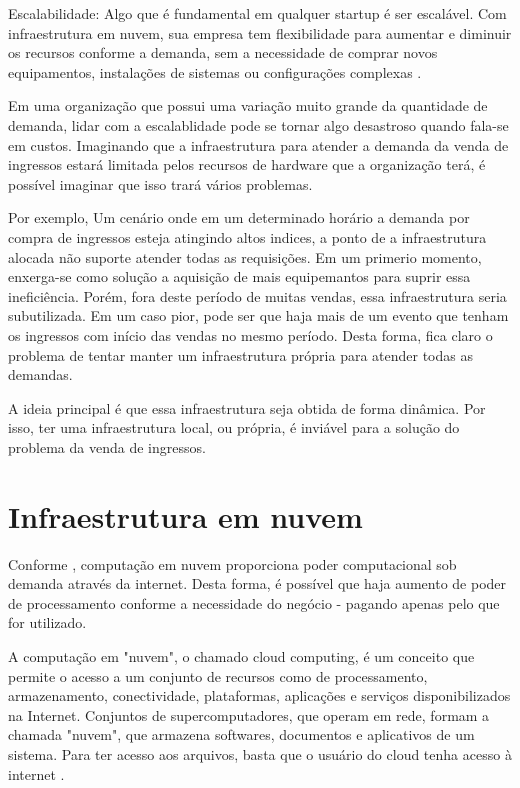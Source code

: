 \begin{citacao}
Escalabilidade: Algo que é fundamental em qualquer startup é ser escalável.
Com infraestrutura em nuvem, sua empresa tem flexibilidade para aumentar e
diminuir os recursos conforme a demanda, sem a necessidade de comprar novos equipamentos, 
instalações de sistemas ou configurações complexas 
\cite{beneficios-da-computacao-em-nuvem-para-sua-startup}.

\end{citacao}

Em uma organização que possui uma variação muito grande da quantidade de demanda, lidar
com a escalablidade pode se tornar algo desastroso quando fala-se em custos. Imaginando
que a infraestrutura para atender a demanda da venda de ingressos estará limitada
pelos recursos de hardware que a organização terá, é possível imaginar que isso trará
vários problemas.

Por exemplo, Um cenário onde em um determinado horário a demanda por compra de ingressos 
esteja atingindo altos indices, a ponto de a infraestrutura alocada não suporte atender 
todas as requisições. Em um primerio momento, enxerga-se como solução a aquisição de mais 
equipemantos para suprir essa ineficiência. Porém, fora deste período de muitas vendas, essa
infraestrutura seria subutilizada. Em um caso pior, pode ser que haja mais de um evento que
tenham os ingressos com início das vendas no mesmo período. Desta forma, fica claro o problema
de tentar manter um infraestrutura própria para atender todas as demandas.

A ideia principal é que essa infraestrutura seja obtida de forma dinâmica. Por isso,
ter uma infraestrutura local, ou própria, é inviável para a solução do problema da
venda de ingressos.

\section{Infraestrutura em nuvem}\label{infraestrutura-em-nuvem}

Conforme \cite{what-is-cloud-computing}, computação em nuvem proporciona poder computacional
sob demanda através da internet. Desta forma, é possível que haja aumento de poder
de processamento conforme a necessidade do negócio - pagando apenas pelo que for utilizado.

\begin{citacao}
A computação em "nuvem", o chamado cloud computing, é um conceito que permite o acesso a
um conjunto de recursos como de processamento, armazenamento, conectividade, plataformas,
aplicações e serviços disponibilizados na Internet. Conjuntos de supercomputadores, que operam em
rede, formam a chamada "nuvem", que armazena softwares, documentos e aplicativos de um sistema.
Para ter acesso aos arquivos, basta que o usuário do cloud tenha acesso à internet
\cite{cloud-computing-conceitos-e-perspectivas-2012}.
\end{citacao}

